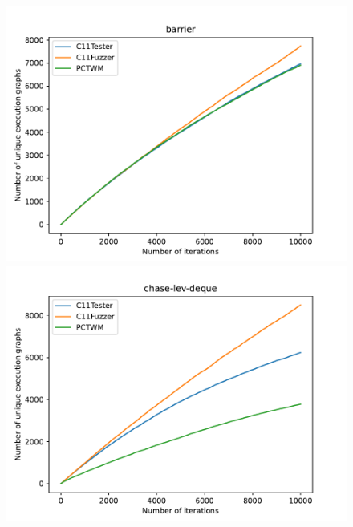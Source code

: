 \begin{figure}[H]
    \centering

    \begin{minipage}{0.45\textwidth}
        \centering
        \includegraphics[width=\textwidth]{figure/pctwm/barrier.pdf}
    \end{minipage}
    \hfill
    \begin{minipage}{0.45\textwidth}
        \centering
        \includegraphics[width=\textwidth]{figure/pctwm/chase-lev-deque.pdf}
    \end{minipage}
    \vspace{0.5cm}


\end{figure}
